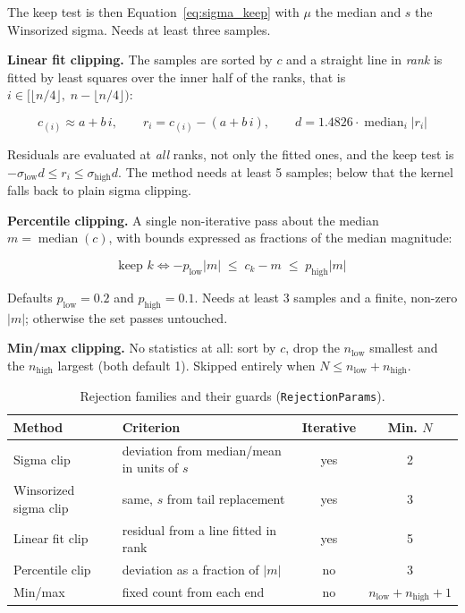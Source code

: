 \documentclass[11pt,a4paper]{article}
\newcommand{\code}[1]{\texttt{\small #1}}
\begin{document}
    The keep test is then Equation~\ref{eq:sigma_keep} with $\mu$ the median and $s$ the Winsorized sigma. Needs at least three samples.

    \textbf{Linear fit clipping.} The samples are sorted by $c$ and a straight line in \emph{rank} is fitted by least squares over the inner half of the ranks, that is $i \in [\lfloor n/4 \rfloor,\; n - \lfloor n/4 \rfloor)$:

    \begin{equation}
        c_{(i)} \approx a + b\,i, \qquad
        r_i = c_{(i)} - (a + b\,i), \qquad
        d = 1.4826 \cdot \operatorname{median}_i \left| r_i \right|
    \end{equation}

    Residuals are evaluated at \emph{all} ranks, not only the fitted ones, and the keep test is $-\sigma_{\text{low}} d \le r_i \le \sigma_{\text{high}} d$. The method needs at least 5 samples; below that the kernel falls back to plain sigma clipping.

    \textbf{Percentile clipping.} A single non-iterative pass about the median $m = \operatorname{median}(c)$, with bounds expressed as fractions of the median magnitude:

    \begin{equation}
        \text{keep } k \iff -p_{\text{low}} \left| m \right| \;\le\; c_k - m \;\le\; p_{\text{high}} \left| m \right|
    \end{equation}

    Defaults $p_{\text{low}} = 0.2$ and $p_{\text{high}} = 0.1$. Needs at least 3 samples and a finite, non-zero $\left| m \right|$; otherwise the set passes untouched.

    \textbf{Min/max clipping.} No statistics at all: sort by $c$, drop the $n_{\text{low}}$ smallest and the $n_{\text{high}}$ largest (both default 1). Skipped entirely when $N \le n_{\text{low}} + n_{\text{high}}$.

    \begin{table}[H]
        \centering
        \begin{tabularx}{\textwidth}{lXcc}
            \toprule
            \textbf{Method} & \textbf{Criterion} & \textbf{Iterative} & \textbf{Min. $N$} \\
            \midrule
            Sigma clip & deviation from median/mean in units of $s$ & yes & 2 \\
            Winsorized sigma clip & same, $s$ from tail replacement & yes & 3 \\
            Linear fit clip & residual from a line fitted in rank & yes & 5 \\
            Percentile clip & deviation as a fraction of $\left| m \right|$ & no & 3 \\
            Min/max & fixed count from each end & no & $n_{\text{low}}{+}n_{\text{high}}{+}1$ \\
            \bottomrule
        \end{tabularx}
        \caption{Rejection families and their guards (\code{RejectionParams}).}
    \end{table}
\end{document}
